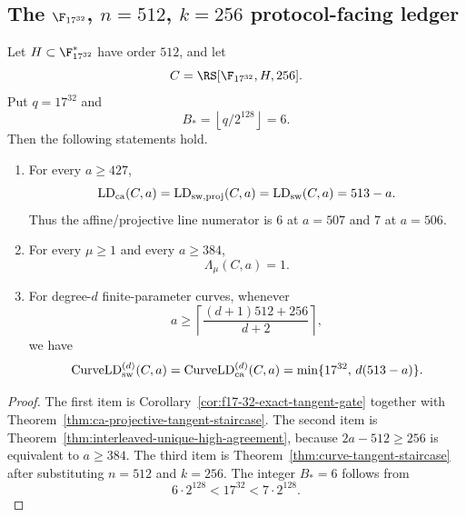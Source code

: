 \subsection{The \(\F_{17^{32}}\), \(n=512\), \(k=256\) protocol-facing ledger}

\begin{corollary}
\label{cor:f17-adjacent-ledgers}
Let \(H\subset\F_{17^{32}}^*\) have order \(512\), and let
\[
  C=\RS[\F_{17^{32}},H,256].
\]
Put \(q=17^{32}\) and
\[
  B_*=\left\lfloor q/2^{128}\right\rfloor=6.
\]
Then the following statements hold.

\begin{enumerate}
\item For every \(a\ge427\),
\[
  \operatorname{LD}_{\rm ca}(C,a)
  =
  \operatorname{LD}_{\rm sw,proj}(C,a)
  =
  \operatorname{LD}_{\rm sw}(C,a)
  =
  513-a.
\]
Thus the affine/projective line numerator is \(6\) at \(a=507\) and \(7\) at
\(a=506\).

\item For every \(\mu\ge1\) and every \(a\ge384\),
\[
  \Lambda_\mu(C,a)=1.
\]

\item For degree-\(d\) finite-parameter curves, whenever
\[
  a\ge
  \left\lceil\frac{(d+1)512+256}{d+2}\right\rceil,
\]
we have
\[
  \operatorname{CurveLD}_{\rm sw}^{(d)}(C,a)
  =
  \operatorname{CurveLD}_{\rm ca}^{(d)}(C,a)
  =
  \min\{17^{32},\,d(513-a)\}.
\]
\end{enumerate}
\end{corollary}

\begin{proof}
The first item is Corollary~\ref{cor:f17-32-exact-tangent-gate} together with
Theorem~\ref{thm:ca-projective-tangent-staircase}.  The second item is
Theorem~\ref{thm:interleaved-unique-high-agreement}, because
\(2a-512\ge256\) is equivalent to \(a\ge384\).  The third item is
Theorem~\ref{thm:curve-tangent-staircase} after substituting \(n=512\) and
\(k=256\).  The integer \(B_*=6\) follows from
\[
  6\cdot2^{128}<17^{32}<7\cdot2^{128}.
\]
\end{proof}

